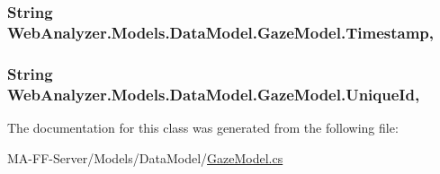 \subsubsection[{Timestamp}]{\setlength{\rightskip}{0pt plus 5cm}String Web\+Analyzer.\+Models.\+Data\+Model.\+Gaze\+Model.\+Timestamp\hspace{0.3cm}{\ttfamily [get]}, {\ttfamily [set]}}\label{class_web_analyzer_1_1_models_1_1_data_model_1_1_gaze_model_af6b9cc989b7eefd89d4070d1683c8539}
\hypertarget{class_web_analyzer_1_1_models_1_1_data_model_1_1_gaze_model_a4fbd98b9986f70848075e65dec5fd8b4}{}
\subsubsection[{Unique\+Id}]{\setlength{\rightskip}{0pt plus 5cm}String Web\+Analyzer.\+Models.\+Data\+Model.\+Gaze\+Model.\+Unique\+Id\hspace{0.3cm}{\ttfamily [get]}, {\ttfamily [set]}}\label{class_web_analyzer_1_1_models_1_1_data_model_1_1_gaze_model_a4fbd98b9986f70848075e65dec5fd8b4}


The documentation for this class was generated from the following file\+:\begin{DoxyCompactItemize}
\item 
M\+A-\/\+F\+F-\/\+Server/\+Models/\+Data\+Model/\hyperlink{_gaze_model_8cs}{Gaze\+Model.\+cs}\end{DoxyCompactItemize}
